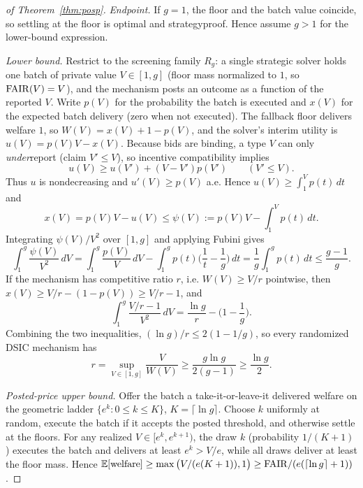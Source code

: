 \begin{proof}[of Theorem~\ref{thm:posp}]
\emph{Endpoint.} If $g=1$, the floor and the batch value coincide, so
settling at the floor is optimal and strategyproof. Hence assume $g>1$
for the lower-bound expression.

\emph{Lower bound.} Restrict to the screening family $R_g$: a single
strategic solver holds one batch of private value $V\in[1,g]$ (floor mass
normalized to $1$, so $\mathrm{FAIR}(V)=V$), and the mechanism posts an outcome
as a function of the reported $V$. Write $p(V)$ for the probability the
batch is executed and $x(V)$ for the expected batch delivery (zero when
not executed). The fallback floor delivers welfare $1$, so
$W(V)=x(V)+1-p(V)$, and the solver's interim utility is
$u(V)=p(V)V-x(V)$. Because bids are binding, a type $V$ can only
\emph{under}report (claim $V'\le V$), so incentive compatibility implies
\[
u(V)\ge u(V')+(V-V')p(V') \qquad (V'\le V).
\]
Thus $u$ is nondecreasing and $u'(V)\ge p(V)$ a.e. Hence
$u(V)\ge\int_1^V p(t)\,dt$ and
\[
x(V)=p(V)V-u(V)\le
\psi(V):=p(V)V-\int_1^V p(t)\,dt .
\]
Integrating $\psi(V)/V^2$ over $[1,g]$ and applying Fubini gives
\[
\int_1^g\frac{\psi(V)}{V^2}\,dV
=\int_1^g\frac{p(V)}{V}\,dV
-\int_1^g p(t)\Big(\frac1t-\frac1g\Big)\,dt
=\frac1g\int_1^g p(t)\,dt
\le\frac{g-1}{g}.
\]
If the mechanism has competitive ratio $r$, i.e. $W(V)\ge V/r$
pointwise, then $x(V)\ge V/r-(1-p(V))\ge V/r-1$, and
\[
\int_1^g \frac{V/r-1}{V^2}\,dV
=\frac{\ln g}{r}-\Big(1-\frac1g\Big).
\]
Combining the two inequalities,
$(\ln g)/r\le2(1-1/g)$, so every randomized DSIC mechanism has
\[
r=\sup_{V\in[1,g]}\frac{V}{W(V)}
\ge\frac{g\ln g}{2(g-1)}
\ge\frac{\ln g}{2}.
\]

\emph{Posted-price upper bound.} Offer the batch a take-it-or-leave-it
delivered welfare on the geometric ladder $\{e^k:0\le k\le K\}$,
$K=\lceil\ln g\rceil$. Choose $k$ uniformly at random, execute the batch
if it accepts the posted threshold, and otherwise settle at the floors.
For any realized $V\in[e^k,e^{k+1})$, the draw $k$ (probability
$1/(K+1)$) executes the batch and delivers at least $e^k>V/e$, while all
draws deliver at least the floor mass. Hence
$\mathbb{E}[\text{welfare}]\ge\max\big(V/(e(K+1)),1\big)\ge\mathrm{FAIR}/(e(\lceil\ln
g\rceil+1))$.


\end{proof}
